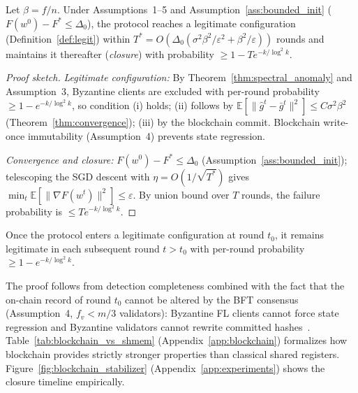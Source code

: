 \begin{theorem}
\label{thm:self_stab}
Let $\beta = f/n$.
Under Assumptions~1--5 and Assumption~\ref{ass:bounded_init} ($F(w^0)-F^* \leq \Delta_0$),
the protocol reaches a legitimate configuration (Definition~\ref{def:legit}) within
$T^* = O\!\left(\Delta_0(\sigma^2\beta^2/\varepsilon^2 + \beta^2/\varepsilon)\right)$ rounds
and maintains it thereafter (\emph{closure}) with probability
$\geq 1 - T e^{-k/\log^2 k}$.
\end{theorem}

\begin{proof}[Proof sketch]
\emph{Legitimate configuration:}
By Theorem~\ref{thm:spectral_anomaly} and Assumption~3, Byzantine clients are excluded
with per-round probability $\geq 1-e^{-k/\log^2 k}$, so condition (i) holds; (ii)
follows by $\mathbb{E}[\|\hat{g}^t-\bar{g}^t\|^2]\leq C\sigma^2\beta^2$
(Theorem~\ref{thm:convergence}); (iii) by the blockchain commit.
Blockchain write-once immutability (Assumption~4) prevents state regression.

\emph{Convergence and closure:}
$F(w^0)-F^*\leq\Delta_0$ (Assumption~\ref{ass:bounded_init}); telescoping the SGD descent
with $\eta=O(1/\sqrt{T^*})$ gives $\min_t\mathbb{E}[\|\nabla F(w^t)\|^2]\leq\varepsilon$.
By union bound over $T$ rounds, the failure probability is $\leq Te^{-k/\log^2 k}$.
\end{proof}

\begin{lemma}
\label{lem:closure}
Once the protocol enters a legitimate configuration at round $t_0$, it remains legitimate
in each subsequent round $t > t_0$ with per-round probability $\geq 1 - e^{-k/\log^2 k}$.
\end{lemma}

The proof follows from detection completeness combined with the fact that the on-chain
record of round $t_0$ cannot be altered by the BFT consensus (Assumption~4,
$f_v < m/3$ validators): Byzantine FL clients cannot force state regression and
Byzantine validators cannot rewrite committed hashes~\cite{garay_backbone}.
Table~\ref{tab:blockchain_vs_shmem} (Appendix~\ref{app:blockchain}) formalizes how
blockchain provides strictly stronger properties than classical shared registers.
Figure~\ref{fig:blockchain_stabilizer} (Appendix~\ref{app:experiments}) shows the closure
timeline empirically.

